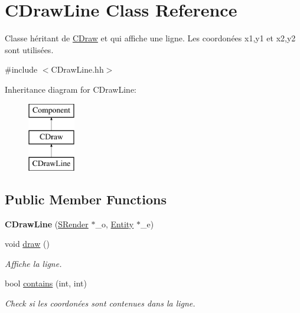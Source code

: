 \hypertarget{class_c_draw_line}{}\section{C\+Draw\+Line Class Reference}
\label{class_c_draw_line}


Classe héritant de \hyperlink{class_c_draw}{C\+Draw} et qui affiche une ligne. Les coordonées x1,y1 et x2,y2 sont utilisées.  




{\ttfamily \#include $<$C\+Draw\+Line.\+hh$>$}

Inheritance diagram for C\+Draw\+Line\+:\begin{figure}[H]
\begin{center}
\leavevmode
\includegraphics[height=3.000000cm]{class_c_draw_line}
\end{center}
\end{figure}
\subsection*{Public Member Functions}
\begin{DoxyCompactItemize}
\item 
\hypertarget{class_c_draw_line_a8fe36db8c556f007a8a4da97a953c24e}{}{\bfseries C\+Draw\+Line} (\hyperlink{class_s_render}{S\+Render} $\ast$\+\_\+o, \hyperlink{class_entity}{Entity} $\ast$\+\_\+e)\label{class_c_draw_line_a8fe36db8c556f007a8a4da97a953c24e}

\item 
\hypertarget{class_c_draw_line_aaab793b66c3afa04cef25375ab886848}{}void \hyperlink{class_c_draw_line_aaab793b66c3afa04cef25375ab886848}{draw} ()\label{class_c_draw_line_aaab793b66c3afa04cef25375ab886848}

\begin{DoxyCompactList}\small\item\em Affiche la ligne. \end{DoxyCompactList}\item 
bool \hyperlink{class_c_draw_line_a23c866473f91bc6aace37d1bc4250ba9}{contains} (int, int)
\begin{DoxyCompactList}\small\item\em Check si les coordonées sont contenues dans la ligne. \end{DoxyCompactList}\end{DoxyCompactItemize}
